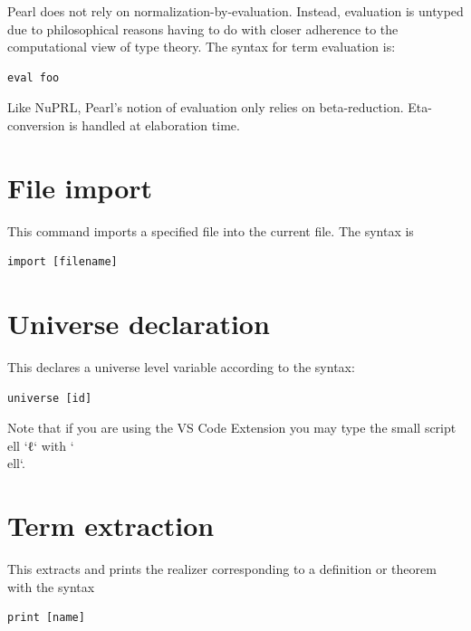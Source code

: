 \documentclass[a4paper]{article}
\begin{document}
Pearl does not rely on normalization-by-evaluation. Instead, evaluation is untyped due to philosophical reasons having to do with closer adherence to the computational view of type theory. The syntax for term evaluation is:

\begin{lstlisting}[style=pearl]
eval foo
\end{lstlisting}

Like NuPRL, Pearl's notion of evaluation only relies on beta-reduction. Eta-conversion is handled at elaboration time.

\section{File import}

This command imports a specified file into the current file. The syntax is 

\begin{lstlisting}[style=pearl]
import [filename]
\end{lstlisting}

\section{Universe declaration }

This declares a universe level variable according to the syntax:

\begin{lstlisting}[style=pearl]
universe [id]
\end{lstlisting}

Note that if you are using the VS Code Extension you may type the small script ell `ℓ` with `\\ell`.

\section{Term extraction} 

This extracts and prints the realizer corresponding to a definition or theorem with the syntax 

\begin{lstlisting}[style=pearl]
print [name]
\end{lstlisting}





\end{document}
